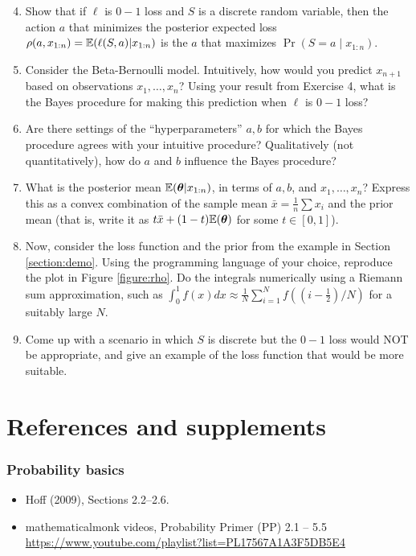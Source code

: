 \documentclass[12pt]{article}
\begin{document}
\begin{enumerate}
\setcounter{enumi}{3}
\item Show that if $\ell$ is $0-1$ loss and $S$ is a discrete random variable, then the action $a$ that minimizes the posterior expected loss $\rho(a,x_{1:n})=\mathbb{E}(\ell(S,a)|x_{1:n})$ is the $a$ that maximizes $\Pr(S=a\mid x_{1:n})$.
\item Consider the Beta-Bernoulli model. Intuitively, how would you predict $x_{n+1}$ based on observations $x_1,\dotsc,x_n$? Using your result from Exercise 4, what is the Bayes procedure for making this prediction when $\ell$ is $0-1$ loss?
\item Are there settings of the ``hyperparameters'' $a,b$ for which the Bayes procedure agrees with your intuitive procedure? Qualitatively (not quantitatively), how do $a$ and $b$ influence the Bayes procedure?
\item What is the posterior mean $\mathbb{E}({\bm\theta}|x_{1:n})$, in terms of $a,b$, and $x_1,\dotsc,x_n$? Express this as a convex combination of the sample mean $\bar x=\frac{1}{n}\sum x_i$ and the prior mean (that is, write it as $t \bar x + (1-t) \mathbb{E}({\bm\theta})$ for some $t\in[0,1]$).
\item Now, consider the loss function and the prior from the example in Section \ref{section:demo}. 
Using the programming language of your choice, reproduce the plot in Figure \ref{figure:rho}. Do the
integrals numerically using a Riemann sum approximation, such as $\int_0^1 f(x)dx \approx \frac{1}{N}\sum_{i = 1}^N f((i-\tfrac{1}{2})/N)$ for a suitably large $N$.
\item Come up with a scenario in which $S$ is discrete but the $0-1$ loss would NOT be appropriate, and give an example of the loss function that would be more suitable.
\end{enumerate}





\section*{References and supplements}

\subsubsection*{Probability basics}
\begin{itemize}
\item Hoff (2009), Sections 2.2--2.6.
\item mathematicalmonk videos, Probability Primer (PP) 2.1 -- 5.5 \\
    \url{https://www.youtube.com/playlist?list=PL17567A1A3F5DB5E4}
\end{itemize}
\end{document}
